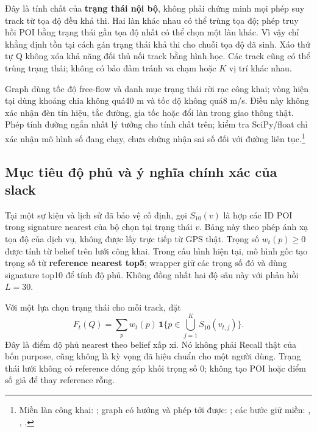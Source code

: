 Đây là tính chất của \textbf{trạng thái nội bộ}, không phải chứng minh
mọi phép suy track từ tọa độ đều khả thi. Hai làn khác nhau có thể trùng
tọa độ; phép truy hồi POI bằng trạng thái gần tọa độ nhất có thể chọn một
làn khác. Vì vậy chỉ khẳng định tồn tại cách gán trạng thái khả thi cho
chuỗi tọa độ đã sinh. Xáo thứ tự Q không xóa khả năng đối thủ nối track
bằng hình học. Các track cũng có thể trùng trạng thái; không có bảo đảm
tránh va chạm hoặc $K$ vị trí khác nhau.

Graph dùng tốc độ free-flow và danh mục trạng thái rời rạc công khai;
vòng hiện tại dùng khoảng chia không quá40 m và tốc độ không quá8 m/s.
Điều này không xác nhận đèn tín hiệu, tắc đường, gia tốc hoặc đổi làn
trong giao thông thật. Phép tính đường ngắn nhất lý tưởng cho tính chất
trên; kiểm tra SciPy/float chỉ xác nhận mô hình số đang chạy, chưa chứng
nhận sai số đối với đường liên tục.\footnote{Miền làn công khai:
; graph có hướng và phép tới được:
; các bước giữ miền:
,
,
.}

\subsection{Mục tiêu độ phủ và ý nghĩa chính xác của slack}
\label{sec:formal-service-cover}

Tại một sự kiện và lịch sử đã bảo vệ cố định, gọi $S_{10}(v)$ là hợp các
ID POI trong signature nearest của bộ chọn tại trạng thái $v$. Bảng này
theo phép ánh xạ tọa độ của dịch vụ, không được lấy trực tiếp từ GPS thật.
Trọng số $w_t(p)\geq0$ được tính từ belief trên lưới công khai. Trong cấu
hình hiện tại, mô hình gốc tạo trọng số từ \textbf{reference nearest
top5}; wrapper giữ các trọng số đó và dùng signature top10 để tính độ
phủ. Không đồng nhất hai độ sâu này với phản hồi $L=30$.

Với một lựa chọn trạng thái cho mỗi track, đặt
\begin{equation}
 F_t(Q)=\sum_p w_t(p)\,
 \mathbf1\{p\in\textstyle\bigcup_{j=1}^K S_{10}(v_{t,j})\}.
 \label{eq:formal-service-cover}
\end{equation}
Đây là điểm độ phủ nearest theo belief xấp xỉ. Nó không phải Recall thật
của bốn purpose, cũng không là kỳ vọng đã hiệu chuẩn cho một người dùng.
Trạng thái lưới không có reference đóng góp khối trọng số 0; không tạo
POI hoặc điểm số giả để thay reference rỗng.

